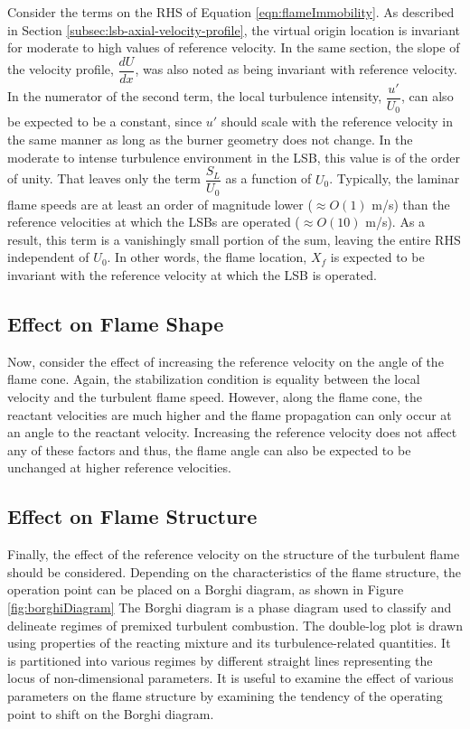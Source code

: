 Consider the terms on the RHS of Equation \ref{eqn:flameImmobility}.
As described in Section \ref{subsec:lsb-axial-velocity-profile}, the virtual origin location is invariant for moderate to high values of reference velocity.
In the same section, the slope of the velocity profile, \(\dfrac{ dU }{ dx }\), was also noted as being invariant with reference velocity.
In the numerator of the second term, the local turbulence intensity, \(\dfrac{ u' }{ U_0 }\), can also be expected to be a constant, since \(u'\) should scale with the reference velocity in the same manner as long as the burner geometry does not change.
In the moderate to intense turbulence environment in the LSB, this value is of the order of unity.\cite{2008-cheng-a}
That leaves only the term \(\dfrac{ S_L }{ U_0 }\) as a function of \(U_0\).
Typically, the laminar flame speeds are at least an order of magnitude lower (\(\approx O(1)\) m/s) than the reference velocities at which the LSBs are operated (\(\approx O(10)\) m/s).
As a result, this term is a vanishingly small portion of the sum, leaving the entire RHS independent of \(U_0\).
In other words, the flame location, \(X_f\) is expected to be invariant with the reference velocity at which the LSB is operated.

\subsection{Effect on Flame Shape}

Now, consider the effect of increasing the reference velocity on the angle of the flame cone.
Again, the stabilization condition is equality between the local velocity and the turbulent flame speed.
However, along the flame cone, the reactant velocities are much higher and the flame propagation can only occur at an angle to the reactant velocity.
Increasing the reference velocity does not affect any of these factors and thus, the flame angle can also be expected to be unchanged at higher reference velocities.

\subsection{Effect on Flame Structure}



Finally, the effect of the reference velocity on the structure of the turbulent flame should be considered.
Depending on the characteristics of the flame structure, the operation point can be placed on a Borghi diagram, as shown in Figure \ref{fig:borghiDiagram}
The Borghi diagram\cite{1985-borghi} is a phase diagram used to classify and delineate regimes of premixed turbulent combustion.
The double-log plot is drawn using properties of the reacting mixture and its turbulence-related quantities.
It is partitioned into various regimes by different straight lines representing the locus of non-dimensional parameters.
It is useful to examine the effect of various parameters on the flame structure by examining the tendency of the operating point to shift on the Borghi diagram.

